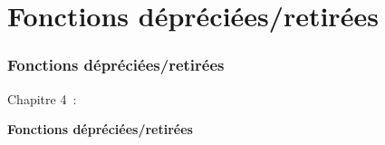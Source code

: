 %

\section{Fonctions dépréciées/retirées}
\begin{frame}[fragile]
	\frametitle{Fonctions dépréciées/retirées}

	\begin{center}\huge{Chapitre 4~:}\end{center}
	\begin{center}\huge{\color{typo3darkgrey}\textbf{Fonctions dépréciées/retirées}}\end{center}

\end{frame}

